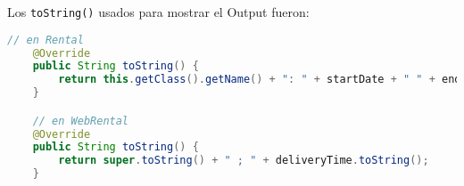 \vspace{1cm}

Los \texttt{toString()} usados para mostrar el Output fueron:


\begin{lstlisting}[style = javaEspecifico, language=Java] 
    // en Rental
    @Override
    public String toString() {
        return this.getClass().getName() + ": " + startDate + " " + endDate+"\n";
    }

    // en WebRental
    @Override
    public String toString() {
        return super.toString() + " ; " + deliveryTime.toString();
    }
\end{lstlisting}